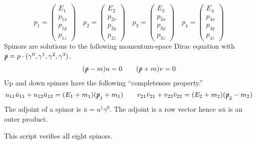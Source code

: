 \documentclass[12pt]{article}
\begin{document}
$$
p_1=\begin{pmatrix}E_1\\p_{1x}\\p_{1y}\\p_{1z}\end{pmatrix}\quad
p_2=\begin{pmatrix}E_2\\p_{2x}\\p_{2y}\\p_{2z}\end{pmatrix}\quad
p_3=\begin{pmatrix}E_3\\p_{3x}\\p_{3y}\\p_{3z}\end{pmatrix}\quad
p_4=\begin{pmatrix}E_4\\p_{4x}\\p_{4y}\\p_{4z}\end{pmatrix}
$$
Spinors are solutions to the following momentum-space Dirac equation with
$\slashed{p}=p\cdot(\gamma^0,\gamma^1,\gamma^2,\gamma^3)$.
$$
(\slashed{p}-m)u=0\qquad(\slashed{p}+m)v=0
$$
Up and down spinors have the following ``completeness property.''
$$
u_{11}\bar{u}_{11}+u_{12}\bar{u}_{12}=(E_1+m_1)(\slashed{p}_1+m_1)\qquad
v_{21}\bar{v}_{21}+v_{22}\bar{v}_{22}=(E_2+m_2)(\slashed{p}_2-m_2)
$$
The adjoint of a spinor is $\bar{u}=u^\dag\gamma^0$.
The adjoint is a row vector hence $u\bar{u}$ is an outer product.

\newpage
\noindent
This script verifies all eight spinors.
\end{document}
